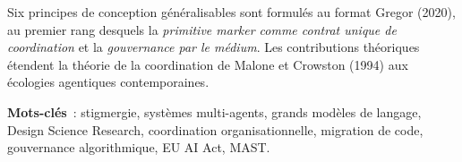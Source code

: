 Six principes de conception g\'en\'eralisables sont formul\'es au format
Gregor (2020), au premier rang desquels la \emph{primitive marker comme
contrat unique de coordination} et la \emph{gouvernance par le m\'edium}.
Les contributions th\'eoriques \'etendent la th\'eorie de la coordination de
Malone et Crowston (1994) aux \'ecologies agentiques contemporaines.

\vspace{0.3cm}
\noindent\textbf{Mots-cl\'es}~: stigmergie, syst\`emes multi-agents, grands
mod\`eles de langage, Design Science Research, coordination organisationnelle,
migration de code, gouvernance algorithmique, EU AI Act, MAST.

\cleardoublepage
